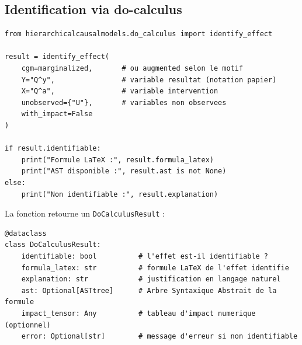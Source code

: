 \documentclass[11pt,a4paper]{article}
\begin{document}
\subsection{Identification via do-calculus}

\begin{lstlisting}[caption={Identification via do-calculus}]
from hierarchicalcausalmodels.do_calculus import identify_effect

result = identify_effect(
    cgm=marginalized,       # ou augmented selon le motif
    Y="Q^y",                # variable resultat (notation papier)
    X="Q^a",                # variable intervention
    unobserved={"U"},       # variables non observees
    with_impact=False
)

if result.identifiable:
    print("Formule LaTeX :", result.formula_latex)
    print("AST disponible :", result.ast is not None)
else:
    print("Non identifiable :", result.explanation)
\end{lstlisting}

La fonction retourne un \texttt{DoCalculusResult} :
\begin{lstlisting}[caption={Structure de DoCalculusResult}]
@dataclass
class DoCalculusResult:
    identifiable: bool          # l'effet est-il identifiable ?
    formula_latex: str          # formule LaTeX de l'effet identifie
    explanation: str            # justification en langage naturel
    ast: Optional[ASTtree]      # Arbre Syntaxique Abstrait de la formule
    impact_tensor: Any          # tableau d'impact numerique (optionnel)
    error: Optional[str]        # message d'erreur si non identifiable
\end{lstlisting}
\end{document}
